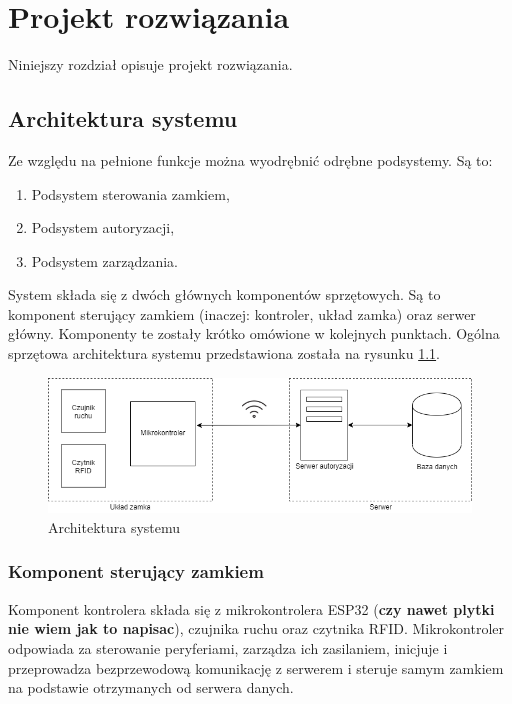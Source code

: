 \chapter{Projekt rozwiązania}
\label{chap:hl-arch}

Niniejszy rozdział opisuje projekt rozwiązania.

\section{Architektura systemu}
Ze względu na pełnione funkcje można wyodrębnić odrębne podsystemy. Są to:
\begin{enumerate}
        \item Podsystem sterowania zamkiem,
        \item Podsystem autoryzacji,
        \item Podsystem zarządzania.
\end{enumerate}

System składa się z dwóch głównych komponentów sprzętowych. Są to komponent sterujący zamkiem (inaczej: kontroler, układ zamka) oraz serwer główny. Komponenty te zostały krótko omówione w kolejnych punktach. Ogólna sprzętowa architektura systemu przedstawiona została na rysunku \ref{fig:hl-arch}.

\begin{figure}[]
        \includegraphics[width=\linewidth]{chapters/images/hl-arch.png}
        \caption{Architektura systemu}
        \label{fig:hl-arch}
\end{figure}

\subsection{Komponent sterujący zamkiem}
Komponent kontrolera składa się z mikrokontrolera ESP32 (\textbf{czy nawet plytki nie wiem jak to napisac}), czujnika ruchu oraz czytnika RFID. Mikrokontroler odpowiada za sterowanie peryferiami, zarządza ich zasilaniem, inicjuje i przeprowadza bezprzewodową komunikację z serwerem i steruje samym zamkiem na podstawie otrzymanych od serwera danych.

